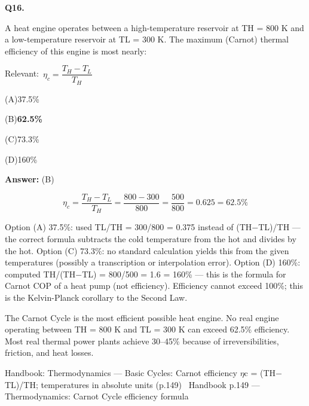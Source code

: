 \documentclass[11pt]{article}
\newcommand{\correct}[1]{\textbf{#1}\;{\color{accent}$\checkmark$}}
\newcommand{\optline}[2]{\par\noindent\hspace{1.2em}(#1)\hspace{0.6em}#2}
\begin{document}
\vspace{9pt}
\filbreak
\textbf{\color{accent}Q16.}\par\vspace{2pt}
A heat engine operates between a high-temperature reservoir at TH = 800 K and a low-temperature reservoir at TL = 300 K. The maximum (Carnot) thermal efficiency of this engine is most nearly:\par\vspace{3pt}
{\small\color{soft}Relevant:}\ $\eta_c = \dfrac{T_H - T_L}{T_H}$\par\vspace{3pt}
\optline{A}{37.5\%}
\optline{B}{\correct{62.5\%}}
\optline{C}{73.3\%}
\optline{D}{160\%}
\par\vspace{3pt}
\vspace{2pt}\par\noindent\colorbox{boxbg}{\parbox{\dimexpr\linewidth-2\fboxsep\relax}{%
\vspace{2pt}\textbf{Answer:} (B)\par\vspace{2pt}
{\small \[\eta_c = \frac{T_H - T_L}{T_H} = \frac{800 - 300}{800} = \frac{500}{800} = 0.625 = 62.5\%\]

Option (A) 37.5\%: used TL/TH = 300/800 = 0.375 instead of (TH$-$TL)/TH --- the correct formula subtracts the cold temperature from the hot and divides by the hot. Option (C) 73.3\%: no standard calculation yields this from the given temperatures (possibly a transcription or interpolation error). Option (D) 160\%: computed TH/(TH$-$TL) = 800/500 = 1.6 = 160\% --- this is the formula for Carnot COP of a heat pump (not efficiency). Efficiency cannot exceed 100\%; this is the Kelvin-Planck corollary to the Second Law.

The Carnot Cycle is the most efficient possible heat engine. No real engine operating between TH = 800 K and TL = 300 K can exceed 62.5\% efficiency. Most real thermal power plants achieve 30--45\% because of irreversibilities, friction, and heat losses.}\par\vspace{2pt}
{\footnotesize\color{soft}Handbook: Thermodynamics --- Basic Cycles: Carnot efficiency $\eta$c = (TH$-$TL)/TH; temperatures in absolute units (p.149) \textbullet\ Handbook p.149 --- Thermodynamics: Carnot Cycle efficiency formula}\vspace{2pt}
}}
\end{document}
